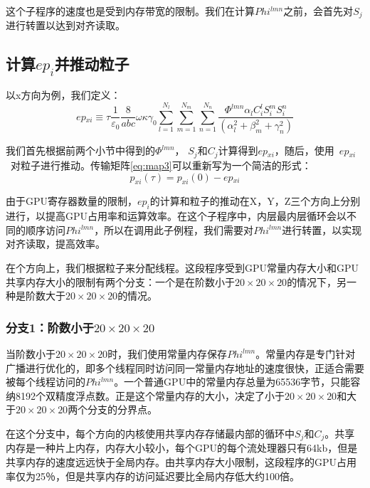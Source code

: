 这个子程序的速度也是受到内存带宽的限制。我们在计算$Phi^{lmn}$之前，会首先对$S_{j}$进行转置以达到对齐读取。

\subsection{计算$ep_i$并推动粒子}
以x方向为例，我们定义：
\begin{equation}
ep{_{xi}}\equiv \tau \frac{1}{{{\varepsilon }_{0}}}\frac{8}{abc}\omega \kappa {{\gamma }_{0}}\sum\limits_{l=1}^{{{N}_{l}}}{\sum\limits_{m=1}^{{{N}_{m}}}{\sum\limits_{n=1}^{{{N}_{n}}}{\frac{\Phi^{lmn}{{\alpha }_{l}}C_{i}^{l}S_{i}^{m}S_{i}^{n}}{(\alpha _{l}^{2}+\beta _{m}^{2}+\gamma _{n}^{2})}}}}
\end{equation}

我们首先根据前两个小节中得到的$\Phi^{lmn}$， $S_{j}^{{}}$和$C_{j}^{{}}$计算得到$ep{_{xi}}$，随后，使用~$ep{_{xi}}$~对粒子进行推动。传输矩阵\ref{eq:map3}可以重新写为一个简洁的形式：
\begin{equation}\label{eq:map4}
{{p}_{xi}}(\tau )={{p}_{xi}}(0)-ep{_{xi}}
\end{equation}

由于GPU寄存器数量的限制，$ep_{i}$的计算和粒子的推动在X，Y，Z三个方向上分别进行，以提高GPU占用率和运算效率。在这个子程序中，内层最内层循环会以不同的顺序访问$Phi^{lmn}$，所以在调用此子例程，我们需要对$ Phi ^ {lmn} $进行转置，以实现对齐读取，提高效率。

在个方向上，我们根据粒子来分配线程。这段程序受到GPU常量内存大小和GPU共享内存大小的限制有两个分支：一个是在阶数小于$20 \times 20 \times 20$的情况下，另一种是阶数大于$20 \times 20 \times 20$的情况。
\subsubsection{分支1：阶数小于$20 \times 20 \times 20$}
当阶数小于$ 20\times20\times20 $时，我们使用常量内存保存$Phi^{lmn}$。常量内存是专门针对广播进行优化的，即多个线程同时访问同一常量内存地址的速度很快，正适合需要被每个线程访问的$Phi^{lmn}$。一个普通GPU中的常量内存总量为65536字节，只能容纳8192个双精度浮点数。正是这个常量内存的大小，决定了小于$20 \times 20 \times 20$和大于$20 \times 20 \times 20$两个分支的分界点。

在这个分支中，每个方向的内核使用共享内存存储最内部的循环中$ S_ {j} $和$ C_ {j} $。共享内存是一种片上内存，内存大小较小，每个GPU的每个流处理器只有64kb，但是共享内存的速度远远快于全局内存。由共享内存大小限制，这段程序的GPU占用率仅为25％，但是共享内存的访问延迟要比全局内存低大约100倍。

